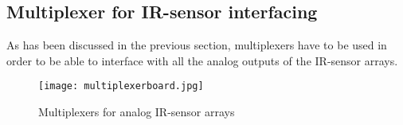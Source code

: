 \documentclass[../report.tex]{subfiles}
\begin{document}
\subsection{Multiplexer for IR-sensor interfacing}
As has been discussed in the previous section, multiplexers have to be used in order to be 
able to interface with all the analog outputs of the IR-sensor arrays.

\begin{figure}[h!]
    \centering
    \texttt{[image: multiplexerboard.jpg]}
    \caption{Multiplexers for analog IR-sensor arrays}
 \end{figure}
\end{document}
